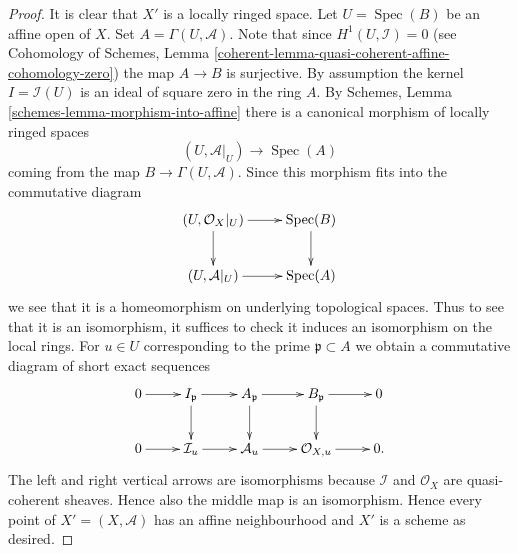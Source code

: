 \documentclass[10pt,a4paper]{amsart}
\theoremstyle{plain}
\theoremstyle{definition}
\theoremstyle{remark}
\numberwithin{equation}{subsection}
\def\Spec{\mathop{\mathrm{Spec}}}
\begin{document}
\begin{proof}
It is clear that $X'$ is a locally ringed space. Let $U = \Spec(B)$
be an affine open of $X$. Set $A = \Gamma(U, \mathcal{A})$. Note that
since $H^1(U, \mathcal{I}) = 0$ (see Cohomology of Schemes, Lemma
\ref{coherent-lemma-quasi-coherent-affine-cohomology-zero})
the map $A \to B$ is surjective. By assumption the kernel
$I = \mathcal{I}(U)$ is an ideal of square zero in the ring $A$.
By
Schemes, Lemma \ref{schemes-lemma-morphism-into-affine}
there is a canonical morphism of locally ringed spaces
$$
(U, \mathcal{A}|_U) \longrightarrow \Spec(A)
$$
coming from the map $B \to \Gamma(U, \mathcal{A})$. Since this morphism
fits into the commutative diagram
$$
\xymatrix{
(U, \mathcal{O}_X|_U) \ar[d] \ar[r] & \Spec(B) \ar[d] \\
(U, \mathcal{A}|_U) \ar[r] & \Spec(A)
}
$$
we see that it is a homeomorphism on underlying topological spaces.
Thus to see that it is an isomorphism, it suffices to check it induces
an isomorphism on the local rings.
For $u \in U$ corresponding to the prime $\mathfrak p \subset A$
we obtain a commutative diagram of short exact sequences
$$
\xymatrix{
0 \ar[r] &
I_{\mathfrak p} \ar[r] \ar[d] &
A_{\mathfrak p} \ar[r] \ar[d] &
B_{\mathfrak p} \ar[r] \ar[d] & 0 \\
0 \ar[r] &
\mathcal{I}_u \ar[r] &
\mathcal{A}_u \ar[r] &
\mathcal{O}_{X, u} \ar[r] & 0.
}
$$
The left and right vertical arrows are isomorphisms because
$\mathcal{I}$ and $\mathcal{O}_X$ are quasi-coherent sheaves.
Hence also the middle map is an isomorphism. Hence every point
of $X' = (X, \mathcal{A})$ has an affine neighbourhood and $X'$ is a
scheme as desired.
\end{proof}
\end{document}
